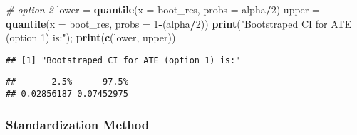 \documentclass[
]{article}
\newenvironment{Shaded}{\begin{snugshade}}{\end{snugshade}}
\newcommand{\CommentTok}[1]{\textcolor[rgb]{0.56,0.35,0.01}{\textit{#1}}}
\newcommand{\DataTypeTok}[1]{\textcolor[rgb]{0.13,0.29,0.53}{#1}}
\newcommand{\DecValTok}[1]{\textcolor[rgb]{0.00,0.00,0.81}{#1}}
\newcommand{\KeywordTok}[1]{\textcolor[rgb]{0.13,0.29,0.53}{\textbf{#1}}}
\newcommand{\NormalTok}[1]{#1}
\newcommand{\OperatorTok}[1]{\textcolor[rgb]{0.81,0.36,0.00}{\textbf{#1}}}
\newcommand{\StringTok}[1]{\textcolor[rgb]{0.31,0.60,0.02}{#1}}
\begin{document}
\begin{Shaded}
\begin{Highlighting}[]
\CommentTok{# option 2}
\NormalTok{lower =}\StringTok{ }\KeywordTok{quantile}\NormalTok{(}\DataTypeTok{x =}\NormalTok{ boot_res, }\DataTypeTok{probs =}\NormalTok{ alpha}\OperatorTok{/}\DecValTok{2}\NormalTok{)}
\NormalTok{upper =}\StringTok{ }\KeywordTok{quantile}\NormalTok{(}\DataTypeTok{x =}\NormalTok{ boot_res, }\DataTypeTok{probs =} \DecValTok{1}\OperatorTok{-}\NormalTok{(alpha}\OperatorTok{/}\DecValTok{2}\NormalTok{))}
\KeywordTok{print}\NormalTok{(}\StringTok{"Bootstraped CI for ATE (option 1) is:"}\NormalTok{); }\KeywordTok{print}\NormalTok{(}\KeywordTok{c}\NormalTok{(lower, upper))}
\end{Highlighting}
\end{Shaded}

\begin{verbatim}
## [1] "Bootstraped CI for ATE (option 1) is:"
\end{verbatim}

\begin{verbatim}
##       2.5%      97.5% 
## 0.02856187 0.07452975
\end{verbatim}

\hypertarget{standardization-method}{%
\subsubsection{Standardization Method}\label{standardization-method}}
\end{document}
